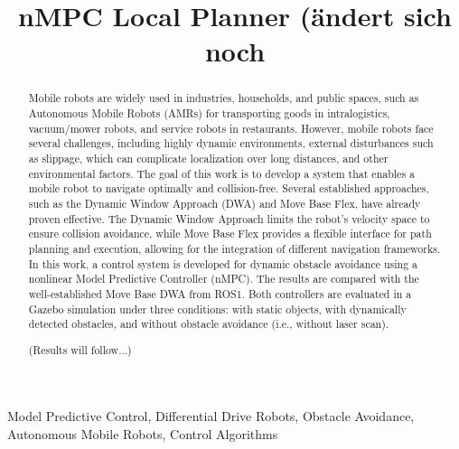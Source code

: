 \documentclass[conference]{IEEEtran}
\begin{document}

\pagestyle{fancy}
\fancyhf{}
\rfoot{\thepage} %

\title{nMPC Local Planner (ändert sich noch}

\author{
}


\maketitle

\begin{abstract}
    Mobile robots are widely used in industries, households, and public spaces, such as Autonomous
    Mobile Robots (AMRs) for transporting goods in intralogistics, vacuum/mower robots, and service
    robots in restaurants. However, mobile robots face several challenges, including highly dynamic
    environments, external disturbances such as slippage, which can complicate localization over 
    long distances, and other environmental factors. The goal of this work is to develop a system that 
    enables a mobile robot to navigate optimally and collision-free. Several established approaches,
    such as the Dynamic Window Approach (DWA) and Move Base Flex, have already proven effective.
    The Dynamic Window Approach limits the robot's velocity space to ensure collision avoidance, while
    Move Base Flex provides a flexible interface for path planning and execution, allowing for the 
    integration of different navigation frameworks. In this work, a control system is developed for 
    dynamic obstacle avoidance using a nonlinear Model Predictive Controller (nMPC). The results are 
    compared with the well-established Move Base DWA from ROS1. Both controllers are evaluated in a 
    Gazebo simulation under three conditions: with static objects, with dynamically detected obstacles, 
    and without obstacle avoidance (i.e., without laser scan).

    (Results will follow...)
\end{abstract}

\begin{IEEEkeywords}
Model Predictive Control, Differential Drive Robots, Obstacle Avoidance, Autonomous Mobile Robots, Control Algorithms
\end{IEEEkeywords}
\end{document}
